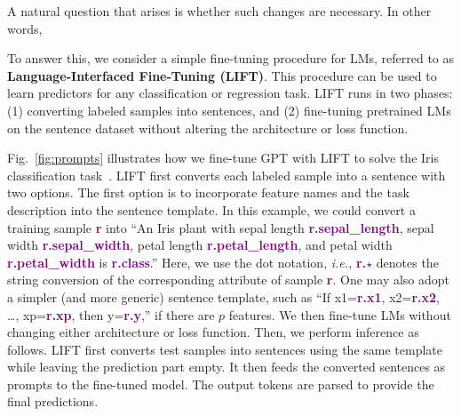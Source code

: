 A natural question that arises is whether such changes are necessary. In other words,\\

To answer this, we consider a simple fine-tuning procedure for LMs, referred to as \textbf{Language-Interfaced Fine-Tuning (\textsc{LIFT})}.
This procedure can be used to learn predictors for any classification or regression task.
\textsc{LIFT} runs in two phases: (1) converting labeled samples into sentences, and (2) fine-tuning pretrained LMs on the sentence dataset without altering the architecture or loss function.

Fig.~\ref{fig:prompts} illustrates how we fine-tune GPT with \textsc{LIFT} to solve the Iris classification task~\cite{iris}. 
\textsc{LIFT} first converts each labeled sample into a sentence with two options. The first option is to incorporate feature names and the task description into the sentence template. In this example, we could convert a training sample \textcolor{purple}{\textbf{r}} into ``An Iris plant with sepal length \textcolor{purple}{\textbf{r.sepal\_length}}, sepal width \textcolor{purple}{\textbf{r.sepal\_width}}, petal length \textcolor{purple}{\textbf{r.petal\_length}}, and petal width \textcolor{purple}{\textbf{r.petal\_width}} is \textcolor{purple}{\textbf{r.class}}.''
Here, we use the dot notation, \textit{i.e.,} \textcolor{purple}{\textbf{r.$\star$}} denotes the string conversion of the corresponding attribute of sample \textcolor{purple}{\textbf{r}}.
One may also adopt a simpler (and more generic) sentence template, such as ``If x1=\textcolor{purple}{\textbf{r.x1}}, x2=\textcolor{purple}{\textbf{r.x2}}, \ldots, xp=\textcolor{purple}{\textbf{r.xp}}, then y=\textcolor{purple}{\textbf{r.y}},'' if there are $p$ features. We then fine-tune LMs without changing either  architecture or loss function. Then, we perform inference as follows.
\textsc{LIFT} first converts test samples into sentences using the same template while leaving the prediction part empty. It then feeds the converted sentences as prompts to the fine-tuned model. The output tokens are parsed to provide the final predictions.

